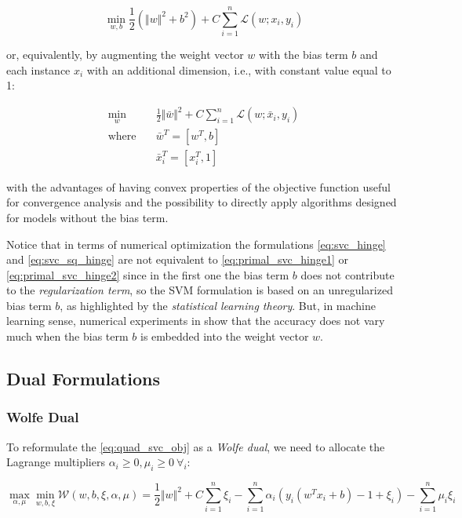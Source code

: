 \begin{equation} \label{eq:primal_svc_hinge1}
    \min_{w,b} \frac{1}{2} (\Vert w \Vert^2 + b^2) + C \sum_{i=1}^n \mathcal{L}(w;x_i,y_i)
\end{equation}

or, equivalently, by augmenting the weight vector $w$ with the bias term $b$ and each instance $x_i$ with an additional dimension, i.e., with constant value equal to 1:

\begin{equation} \label{eq:primal_svc_hinge2}
    \begin{aligned}
        \min_{w} \quad & \frac{1}{2} \Vert \bar{w} \Vert^2 + C \sum_{i=1}^n \mathcal{L}(w;\bar{x}_i,y_i) \\
            \textrm{where} \quad & \bar{w}^T = [w^T, b] \\ & \bar{x}_i^T = [x_i^T, 1]
    \end{aligned}
\end{equation}

with the advantages of having convex properties of the objective function useful for convergence analysis and the possibility to directly apply algorithms designed for models without the bias term.

Notice that in terms of numerical optimization the formulations \ref{eq:svc_hinge} and \ref{eq:svc_sq_hinge} are not equivalent to \ref{eq:primal_svc_hinge1} or \ref{eq:primal_svc_hinge2} since in the first one the bias term $b$ does not contribute to the \emph{regularization term}, so the SVM formulation is based on an unregularized bias term $b$, as highlighted by the \emph{statistical learning theory}. But, in machine learning sense, numerical experiments in \cite{hsu2002simple} show that the accuracy does not vary much when the bias term $b$ is embedded into the weight vector $w$.

\subsection{Dual Formulations}

\subsubsection{Wolfe Dual}

To reformulate the \ref{eq:quad_svc_obj} as a \emph{Wolfe dual}, we need to allocate the Lagrange multipliers $\alpha_i\geq 0, \mu_i \geq 0 \ \forall_i$:

\begin{equation} \label{eq:svc_wolfe_dual}
    \max_{\alpha,\mu} \min_{w,b,\xi} \mathcal{W}(w,b,\xi,\alpha,\mu) = \frac{1}{2}\Vert w\Vert^{2}+C\sum_{i=1}^n\xi_i-\sum_{i=1}^n\alpha_i(y_i(w^T x_i + b)-1+\xi_i)-\sum_{i=1}^n\mu_i\xi_i
\end{equation}

